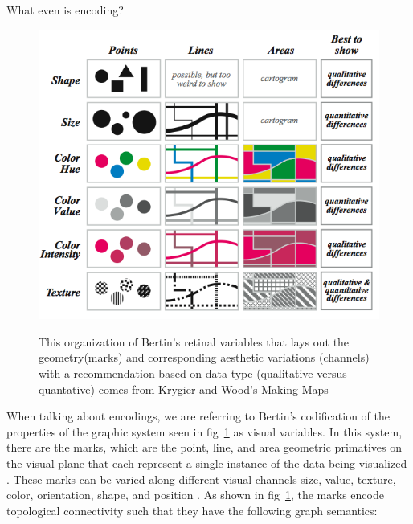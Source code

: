 \documentclass[letterpaper,onecolumn,titlepage]{Ythesis}
\begin{document}
 What even is encoding?

 \begin{figure}
 \end{figure}
 \begin{figure}
    \includegraphics{figures/intro/retinal_variables}
    \label{fig:retinal_variable}
    \caption{This organization of Bertin's retinal variables \cite{bertinSemiologyGraphicsDiagrams2011} that lays out the geometry(marks) and corresponding aesthetic variations (channels) with a recommendation based on data type (qualitative versus quantative) comes from Krygier and Wood's Making Maps \cite{krygierMakingMapsVisual2005}}
\end{figure}

When talking about encodings, we are referring to Bertin's codification of the properties of the graphic system \cite{bertinIIPropertiesGraphic2011} seen in fig~\ref{fig:retinal_variable} as visual variables. In this system, there are the marks, which are the point, line, and area geometric primatives on the visual plane that each represent a single instance of the data being visualized \cite{bertinIIPropertiesGraphic2011,munznerMarksChannels2014}. These marks can be varied along different visual channels  size, value, texture, color, orientation, shape, and position \cite{bertinIIPropertiesGraphic2011, munznerMarksChannels2014}. As shown in fig~\ref{fig:retinal_variable}, the marks encode topological connectivity such that they have the following graph semantics:
\end{document}
